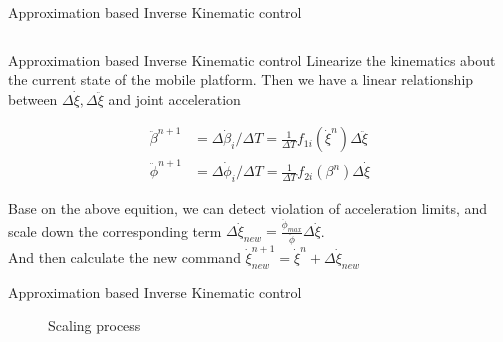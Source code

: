 \documentclass[10pt]{beamer}
\begin{document}
\begin{frame}{Approximation based Inverse Kinematic control}
\begin{columns}[T,onlytextwidth]
  \end{columns}

  
  
\end{frame}

\begin{frame}{Approximation based Inverse Kinematic control}
Linearize the kinematics about the current state of the mobile platform. Then we have a linear relationship between 
$\Delta\dot{\xi},\Delta\ddot{\xi}$ and joint acceleration

\begin{equation}\label{eq:deltaRelation}
  \begin{split}
      \ddot{\beta}^{n+1}&=\Delta\dot{\beta}_i/\Delta T=\frac{1}{\Delta T}f_{1i}(\dot{\xi}^n)\Delta\ddot{\xi}\\
      \ddot{\phi}^{n+1}&=\Delta\dot{\phi}_i/\Delta T=\frac{1}{\Delta T}f_{2i}(\beta^n)\Delta\dot{\xi}
  \end{split}
\end{equation}

Base on the above equition, we can detect violation of acceleration limits, and scale down the corresponding term 
$\Delta\dot{\xi}_{new}= \frac{\ddot{\phi}_{max}}{\ddot{\phi}}\Delta\dot{\xi}$.\\
And then calculate the new command $\dot{\xi}^{n+1}_{new}=\dot{\xi}^n+\Delta\dot{\xi}_{new}$
\end{frame}
\begin{frame}{Approximation based Inverse Kinematic control}
  \begin{figure}
    \begin{center}
    \resizebox{7cm}{!}
      {
      }
    \end{center}
    \caption{Scaling process}
  \end{figure}
\end{frame}
\end{document}
